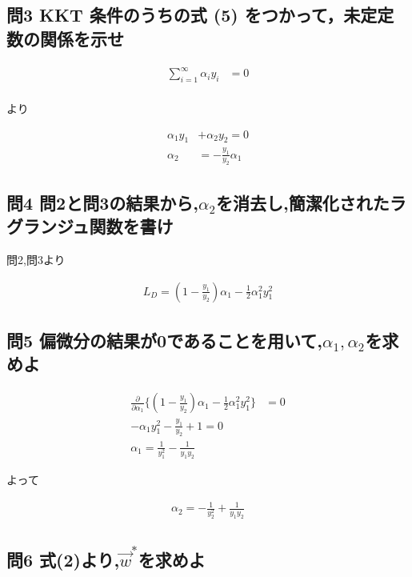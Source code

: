 \documentclass[dvipdfmx,autodetect-engine,titlepage]{jsarticle}
\begin{document}
\subsection*{問3 KKT 条件のうちの式 (5) をつかって，未定定数の関係を示せ}

\begin{align*}
  \sum_{i = 1}^{\infty} \alpha_i y_i &= 0\\
\end{align*}

より

\begin{align*}
  \alpha_1 y_1 &+ \alpha_2 y_2 = 0\\
  \alpha_2 &= -\frac{y_1}{y_2}\alpha_1
\end{align*}

\subsection*{問4 問2と問3の結果から,\begin{math}\alpha_2\end{math}を消去し,簡潔化されたラグランジュ関数を書け}

問2,問3より

\begin{align*}
  L_D = (1 - \frac{y_1}{y_2})\alpha_1 - \frac{1}{2}\alpha_1^2 y_1^2
\end{align*}

\subsection*{問5 偏微分の結果が0であることを用いて,\begin{math}\alpha_1,\alpha_2\end{math}を求めよ}

\begin{align*}
  \frac{\partial}{\partial \alpha_1}\{ (1 - \frac{y_1}{y_2})\alpha_1 - \frac{1}{2}\alpha_1^2 y_1^2 \}  &= 0\\
  -\alpha_1 y_1^2 - \frac{y_1}{y_2} + 1 = 0\\
  \alpha_1 = \frac{1}{y_1^2} - \frac{1}{y_1 y_2}
\end{align*}

よって

\begin{align*}
  \alpha_2 = -\frac{1}{y_2^2} + \frac{1}{y_1 y_2}
\end{align*}

\subsection*{問6 式(2)より,\begin{math}\overrightarrow{w}^*\end{math}を求めよ}
\end{document}
